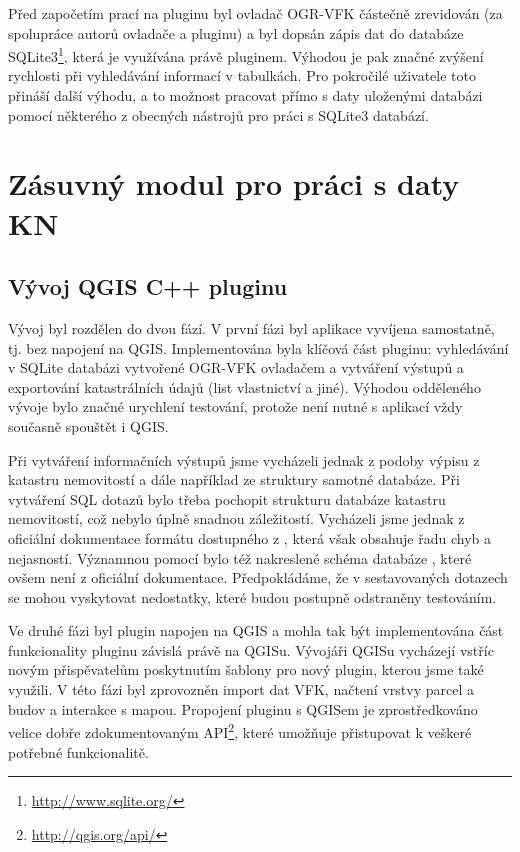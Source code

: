 \documentclass[a4paper,10pt]{article}
\begin{document}
Před započetím prací na pluginu byl ovladač OGR-VFK částečně zrevidován (za spolupráce autorů ovladače a pluginu)
a byl dopsán zápis dat do databáze SQLite3\footnote{\url{http://www.sqlite.org/}}, která je využívána právě pluginem.
Výhodou je pak značné zvýšení rychlosti při vyhledávání informací v tabulkách.
Pro pokročilé uživatele toto přináší další výhodu, a to možnost pracovat přímo s daty uloženými databázi pomocí některého z obecných nástrojů pro práci s SQLite3 databází.


\section{Zásuvný modul pro práci s daty KN}

\subsection{Vývoj QGIS C++ pluginu}
Vývoj byl rozdělen do dvou fází.
V první fázi byl aplikace vyvíjena samostatně, tj. bez napojení na QGIS.
Implementována byla klíčová část pluginu: vyhledávání v SQLite databázi vytvořené OGR-VFK ovladačem a vytváření výstupů a exportování katastrálních údajů (list vlastnictví a jiné).
Výhodou odděleného vývoje bylo značné urychlení testování, protože není nutné s aplikací vždy současně spouštět i QGIS.

Při vytváření informačních výstupů jsme vycházeli jednak z podoby výpisu z katastru nemovitostí a dále například ze struktury samotné databáze.
Při vytváření SQL dotazů bylo třeba pochopit strukturu databáze katastru nemovitostí, což nebylo úplně snadnou záležitostí.
Vycházeli jsme jednak z oficiální dokumentace formátu dostupného z \cite{VFKDokumentace},
která však obsahuje řadu  chyb a nejasností.
Významnou pomocí bylo též nakreslené schéma databáze \cite{MartinThesis}, které ovšem není z oficiální dokumentace.
Předpokládáme, že v sestavovaných dotazech se mohou vyskytovat nedostatky, které budou postupně odstraněny testováním.

Ve druhé fázi byl plugin napojen na QGIS a mohla tak být implementována část funkcionality pluginu závislá právě na QGISu.
Vývojáři QGISu vycházejí vstříc novým přispěvatelům poskytnutím šablony pro nový plugin, kterou jsme také využili.
V této fázi byl zprovozněn import dat VFK, načtení vrstvy parcel a budov a interakce s mapou.
Propojení pluginu s QGISem je zprostředkováno velice dobře zdokumentovaným API\footnote{\url{http://qgis.org/api/}},
které umožňuje přistupovat k veškeré potřebné funkcionalitě.
\end{document}
